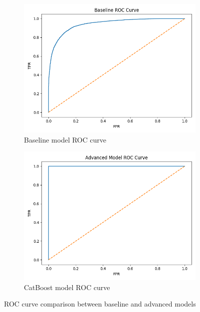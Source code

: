 \documentclass[11pt,a4paper]{article}
\begin{document}
\begin{figure}[H]
    \centering
    \begin{subfigure}{0.48\textwidth}
        \includegraphics[width=\textwidth]{figures/roc_baseline.png}
        \caption{Baseline model ROC curve}
    \end{subfigure}
    \hfill
    \begin{subfigure}{0.48\textwidth}
        \includegraphics[width=\textwidth]{figures/roc_advanced.png}
        \caption{CatBoost model ROC curve}
    \end{subfigure}
    \caption{ROC curve comparison between baseline and advanced models}
    \label{fig:roc_comparison}
\end{figure}
\end{document}
